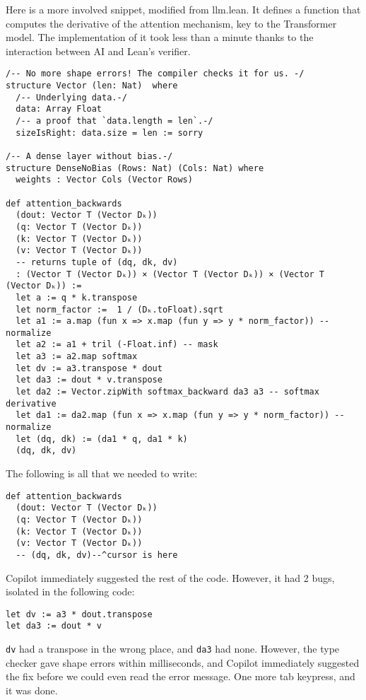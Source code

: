 \documentclass{article}
\begin{document}
Here is a more involved snippet, modified from llm.lean. It defines a function that computes the derivative of the attention mechanism, key to the Transformer model. The implementation of it took less than a minute thanks to the interaction between AI and Lean's verifier.

\begin{verbatim}
/-- No more shape errors! The compiler checks it for us. -/
structure Vector (len: Nat)  where
  /-- Underlying data.-/
  data: Array Float
  /-- a proof that `data.length = len`.-/
  sizeIsRight: data.size = len := sorry

/-- A dense layer without bias.-/
structure DenseNoBias (Rows: Nat) (Cols: Nat) where
  weights : Vector Cols (Vector Rows)

def attention_backwards
  (dout: Vector T (Vector Dₖ))
  (q: Vector T (Vector Dₖ))
  (k: Vector T (Vector Dₖ))
  (v: Vector T (Vector Dₖ))
  -- returns tuple of (dq, dk, dv)
  : (Vector T (Vector Dₖ)) × (Vector T (Vector Dₖ)) × (Vector T (Vector Dₖ)) :=
  let a := q * k.transpose
  let norm_factor :=  1 / (Dₖ.toFloat).sqrt
  let a1 := a.map (fun x => x.map (fun y => y * norm_factor)) -- normalize
  let a2 := a1 + tril (-Float.inf) -- mask
  let a3 := a2.map softmax
  let dv := a3.transpose * dout
  let da3 := dout * v.transpose
  let da2 := Vector.zipWith softmax_backward da3 a3 -- softmax derivative
  let da1 := da2.map (fun x => x.map (fun y => y * norm_factor)) -- normalize
  let (dq, dk) := (da1 * q, da1 * k)
  (dq, dk, dv)
\end{verbatim}

The following is all that we needed to write:

\begin{verbatim}
def attention_backwards
  (dout: Vector T (Vector Dₖ))
  (q: Vector T (Vector Dₖ))
  (k: Vector T (Vector Dₖ))
  (v: Vector T (Vector Dₖ))
  -- (dq, dk, dv)--^cursor is here
\end{verbatim}

Copilot immediately suggested the rest of the code. However, it had 2 bugs, isolated in the following code:

\begin{verbatim}
let dv := a3 * dout.transpose
let da3 := dout * v
\end{verbatim}

\texttt{dv} had a transpose in the wrong place, and \texttt{da3} had none. However, the type checker gave shape errors within milliseconds, and Copilot immediately suggested the fix before we could even read the error message. One more tab keypress, and it was done.
\end{document}
